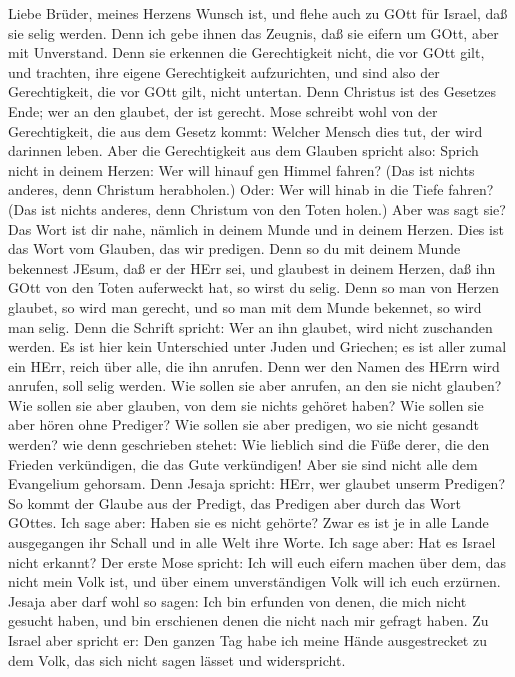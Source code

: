  Liebe Brüder, meines Herzens Wunsch ist, und flehe auch zu
GOtt für Israel, daß sie selig werden.  Denn ich gebe ihnen
das Zeugnis, daß sie eifern um GOtt, aber mit Unverstand. 
Denn sie erkennen die Gerechtigkeit nicht, die vor GOtt gilt, und
trachten, ihre eigene Gerechtigkeit aufzurichten, und sind also der
Gerechtigkeit, die vor GOtt gilt, nicht untertan.  Denn
Christus ist des Gesetzes Ende; wer an den glaubet, der ist gerecht.
 Mose schreibt wohl von der Gerechtigkeit, die aus dem
Gesetz kommt: Welcher Mensch dies tut, der wird darinnen leben.
 Aber die Gerechtigkeit aus dem Glauben spricht also: Sprich
nicht in deinem Herzen: Wer will hinauf gen Himmel fahren? (Das ist
nichts anderes, denn Christum herabholen.)  Oder: Wer will
hinab in die Tiefe fahren? (Das ist nichts anderes, denn Christum von
den Toten holen.)  Aber was sagt sie? Das Wort ist dir nahe,
nämlich in deinem Munde und in deinem Herzen. Dies ist das Wort vom
Glauben, das wir predigen.  Denn so du mit deinem Munde
bekennest JEsum, daß er der HErr sei, und glaubest in deinem Herzen, daß
ihn GOtt von den Toten auferweckt hat, so wirst du selig. 
Denn so man von Herzen glaubet, so wird man gerecht, und so man mit dem
Munde bekennet, so wird man selig.  Denn die Schrift
spricht: Wer an ihn glaubet, wird nicht zuschanden werden. 
Es ist hier kein Unterschied unter Juden und Griechen; es ist aller
zumal ein HErr, reich über alle, die ihn anrufen.  Denn wer
den Namen des HErrn wird anrufen, soll selig werden.  Wie
sollen sie aber anrufen, an den sie nicht glauben? Wie sollen sie aber
glauben, von dem sie nichts gehöret haben? Wie sollen sie aber hören
ohne Prediger?  Wie sollen sie aber predigen, wo sie nicht
gesandt werden? wie denn geschrieben stehet: Wie lieblich sind die Füße
derer, die den Frieden verkündigen, die das Gute verkündigen!
 Aber sie sind nicht alle dem Evangelium gehorsam. Denn
Jesaja spricht: HErr, wer glaubet unserm Predigen?  So
kommt der Glaube aus der Predigt, das Predigen aber durch das Wort
GOttes.  Ich sage aber: Haben sie es nicht gehörte? Zwar es
ist je in alle Lande ausgegangen ihr Schall und in alle Welt ihre Worte.
 Ich sage aber: Hat es Israel nicht erkannt? Der erste Mose
spricht: Ich will euch eifern machen über dem, das nicht mein Volk ist,
und über einem unverständigen Volk will ich euch erzürnen. 
Jesaja aber darf wohl so sagen: Ich bin erfunden von denen, die mich
nicht gesucht haben, und bin erschienen denen die nicht nach mir gefragt
haben.  Zu Israel aber spricht er: Den ganzen Tag habe ich
meine Hände ausgestrecket zu dem Volk, das sich nicht sagen lässet und
widerspricht.

